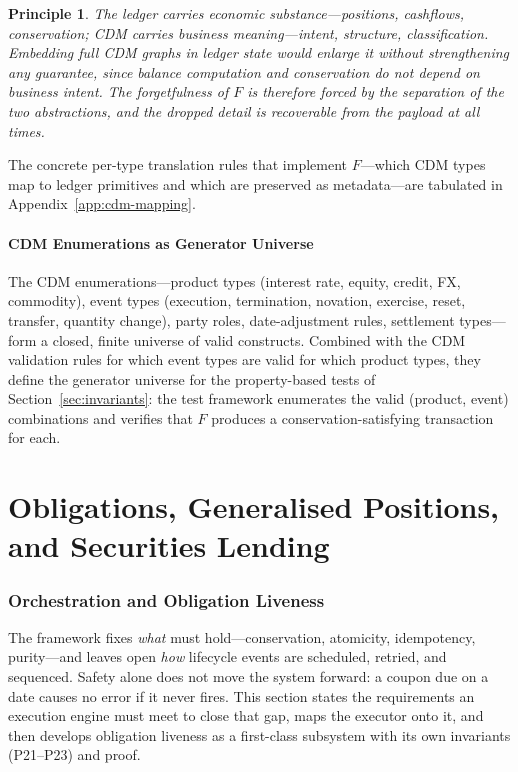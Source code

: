 \documentclass[11pt,a4paper]{article}
\newtheorem{principle}[definition]{Principle}
\begin{document}
\begin{principle}
The ledger carries economic substance---positions, cashflows, conservation; CDM carries business meaning---intent, structure, classification. Embedding full CDM graphs in ledger state would enlarge it without strengthening any guarantee, since balance computation and conservation do not depend on business intent. The forgetfulness of $F$ is therefore forced by the separation of the two abstractions, and the dropped detail is recoverable from the payload at all times.
\end{principle}

The concrete per-type translation rules that implement $F$---which CDM types map to ledger primitives and which are preserved as metadata---are tabulated in Appendix~\ref{app:cdm-mapping}.

\subsection{CDM Enumerations as Generator Universe}

The CDM enumerations---product types (interest rate, equity, credit, FX, commodity), event types (execution, termination, novation, exercise, reset, transfer, quantity change), party roles, date-adjustment rules, settlement types---form a closed, finite universe of valid constructs. Combined with the CDM validation rules for which event types are valid for which product types, they define the generator universe for the property-based tests of Section~\ref{sec:invariants}: the test framework enumerates the valid (product, event) combinations and verifies that $F$ produces a conservation-satisfying transaction for each.


\part{Obligations, Generalised Positions, and Securities Lending}
\section{Orchestration and Obligation Liveness}
\label{sec:temporal}

The framework fixes \emph{what} must hold---conservation, atomicity, idempotency, purity---and leaves open \emph{how} lifecycle events are scheduled, retried, and sequenced. Safety alone does not move the system forward: a coupon due on a date causes no error if it never fires. This section states the requirements an execution engine must meet to close that gap, maps the executor onto it, and then develops obligation liveness as a first-class subsystem with its own invariants (P21--P23) and proof.
\end{document}
